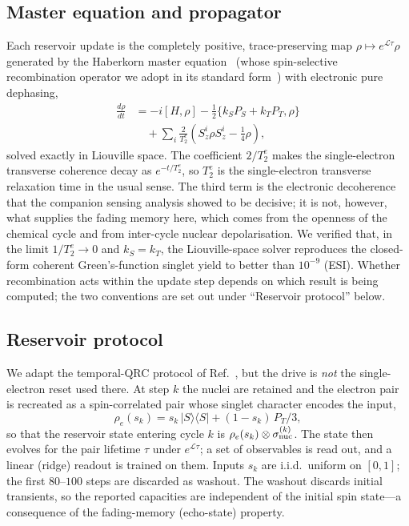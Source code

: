 \documentclass[aps,prx,reprint,superscriptaddress,nofootinbib,floatfix]{revtex4-2}
\begin{document}
\subsection{Master equation and propagator}
Each reservoir update is the completely positive, trace-preserving map
$\rho\mapsto e^{\mathcal{L}\tau}\rho$ generated by the Haberkorn master
equation~\cite{Haberkorn1976} (whose spin-selective recombination operator we adopt
in its standard form~\cite{Jones2010}) with electronic pure dephasing,
\begin{align}
\frac{d\rho}{dt}
 &= -i[H,\rho]
 - \tfrac12\{k_S P_S + k_T P_T,\rho\} \nonumber\\
 &\quad + \sum_{i}\frac{2}{T_2^e}\!\left(S_z^i\rho S_z^i-\tfrac14\rho\right),
\label{eq:me}
\end{align}
solved exactly in Liouville space. The coefficient $2/T_2^e$ makes the
single-electron transverse coherence decay as $e^{-t/T_2^e}$, so $T_2^e$ is
the single-electron transverse relaxation time in the usual sense. The third term is the electronic decoherence
that the companion sensing analysis showed to be decisive; it is not, however,
what supplies the fading memory here, which comes from the openness of the
chemical cycle and from inter-cycle nuclear depolarisation. We verified that, in the limit $1/T_2^e\to0$ and $k_S=k_T$, the
Liouville-space solver reproduces the closed-form coherent Green's-function singlet
yield to better than $10^{-9}$ (ESI). Whether recombination acts
within the update step depends on which result is being computed; the two
conventions are set out under ``Reservoir protocol'' below.

\subsection{Reservoir protocol}
We adapt the temporal-QRC protocol of Ref.~\cite{Fujii2017}, but the drive is
\emph{not} the single-electron reset used there. At step $k$ the nuclei are
retained and the electron pair is recreated as a spin-correlated pair whose
singlet character encodes the input,
\begin{equation}
\rho_e(s_k)=s_k\,|S\rangle\langle S|+(1-s_k)\,P_T/3 ,
\label{eq:birth}
\end{equation}
so that the reservoir state entering cycle $k$ is
$\rho_e(s_k)\otimes\sigma_{\rm nuc}^{(k)}$. The state then evolves for the pair
lifetime $\tau$ under $e^{\mathcal{L}\tau}$; a set of observables is read out, and
a linear (ridge) readout is trained on them. Inputs $s_k$ are i.i.d.\ uniform on
$[0,1]$; the first $80$--$100$ steps are discarded as washout. The washout
discards initial transients, so the reported capacities are independent of the
initial spin state---a consequence of the fading-memory (echo-state) property.
\end{document}
